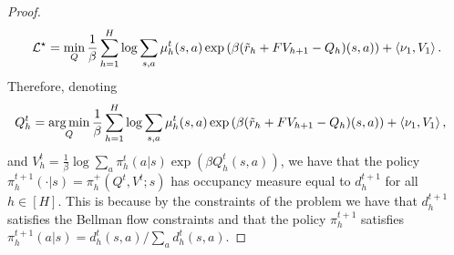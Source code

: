 \begin{proof}
\begin{align*}
\mathcal{L}^\star = \min_{Q} \frac{1}{\beta}\sum^H_{h=1} \log \sum_{s,a} \mu_h^t(s,a) \exp\left({\beta(\tilde{r}_h + FV_{h+1} - Q_h)(s,a)}\right) + \left\langle{\nu_1},{V_1}\right\rangle.
\end{align*}
Therefore, denoting \begin{align*}
    Q^t_h &= \operatorname*{arg\,min}_{Q} \frac{1}{\beta}\sum^H_{h=1} \log \sum_{s,a} \mu_h^t(s,a) \exp\left({\beta(\tilde{r}_h + FV_{h+1} - Q_h)(s,a)}\right) + \left\langle{\nu_1},{V_1}\right\rangle,
\end{align*} and $V^t_h = \frac{1}{\beta} \log \sum_a \pi^t_h(a|s)\exp(\beta Q^t_h(s,a))$, we have that the policy $\pi^{t+1}_h(\cdot|s) = \pi^{+}_h(Q^t,V^t;s) $ has occupancy measure equal to $d^{t+1}_h$ for all $h\in[H]$.
This is because by the constraints of the problem we have that $d^{t+1}_h$ satisfies the Bellman flow constraints and that the policy $\pi^{t+1}_h$ satisfies $\pi^{t+1}_h(a|s) = d^t_h(s,a)/\sum_{a}d^t_h(s,a)$.
\end{proof}
